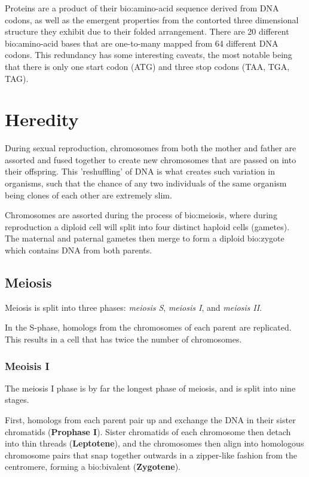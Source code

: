 Proteins are a product of their \gls{bio:amino-acid} sequence derived from DNA codons, as well as the emergent properties from the contorted three dimensional structure they exhibit due to their folded arrangement.  There are 20 different \gls{bio:amino-acid} bases that are one-to-many mapped from 64 different DNA codons. This redundancy has some interesting caveats, the most notable being that there is only one start codon (ATG) and three stop codons (TAA, TGA, TAG).

\section{Heredity}

During sexual reproduction, chromosomes from both the mother and father are assorted and fused together to create new chromosomes that are passed on into their offspring. This 'reshuffling' of DNA is what creates such variation in organisms, such that the chance of any two individuals of the same organism being clones of each other are extremely slim.

Chromosomes are assorted during the process of \gls{bio:meiosis}, where during reproduction a diploid cell will split into four distinct haploid cells (gametes). The maternal and paternal gametes then merge to form a diploid \gls{bio:zygote} which contains DNA from both parents.


\subsection{Meiosis}

Meiosis is split into three phases: \textit{meiosis S}, \textit{meiosis I}, and \textit{meiosis II}. 

In the S-phase, homologs from the chromosomes of each parent are replicated. This results in a cell that has twice the number of chromosomes.

\subsubsection{Meoisis I}

The meiosis I phase is by far the longest phase of meiosis, and is split into nine stages. 

First, homologs from each parent pair up and exchange the DNA in their sister chromatids (\textbf{Prophase I}).  Sister chromatids of each chromosome then detach into thin threads (\textbf{Leptotene}), and the chromosomes then align into homologous chromosome pairs that snap together outwards in a zipper-like fashion from the centromere, forming a \gls{bio:bivalent} (\textbf{Zygotene}). 


